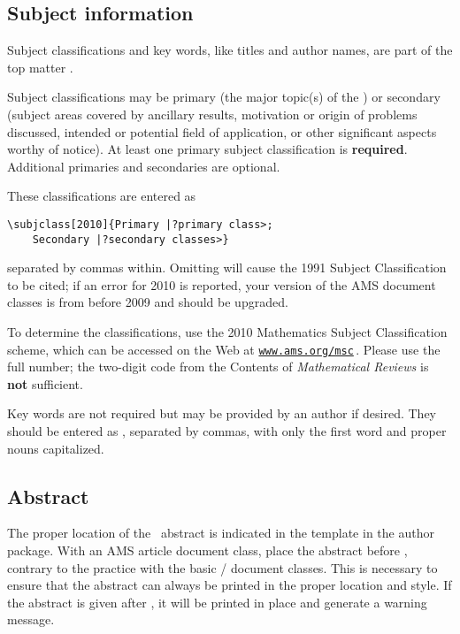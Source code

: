 \subsection{Subject information}
Subject classifications and key words, like titles and author names, are
part of the top matter%
.

Subject classifications may be primary (the major topic(s) of the
)
or secondary (subject areas covered by ancillary results,
motivation or origin of problems discussed, intended or potential
field of application, or other significant aspects worthy of notice).
At least one primary subject classification is \textbf{required}.
Additional primaries and secondaries are optional.

\begin{samepage}
These classifications are entered as
\begin{verbatim}
\subjclass[2010]{Primary |?primary class>; 
    Secondary |?secondary classes>}
\end{verbatim}
separated by commas within. Omitting  will cause the
1991 Subject Classification
to be cited; if an error for 2010 is reported, your version of the AMS
document classes is from before 2009 and should be upgraded.
\end{samepage}

To determine the classifications, use the 2010 Mathematics Subject
Classification scheme,
which can be accessed on the Web at
\href{http://www.ams.org/msc}{\texttt{www.ams.org/msc}}\,.
Please use the full number; the two-digit code from the Contents of
\textit{Mathematical Reviews} is \textbf{not} sufficient.

Key words are not required but may be provided by an author if desired.
They should be entered as , separated by commas,
with only the first word and proper nouns capitalized.

\ifmonograph
\else
\subsection{Abstract}
\ifmemoirs
 The proper location of the \Memos\ abstract is indicated in
 the template in the author package.
\else
 With an AMS article document class, place the abstract before ,
 contrary to the practice with the basic \latex/ document classes.
 This is necessary to ensure that the abstract can always be printed in
 the proper location and style.  If the abstract is given after
 , it will be printed in place and generate a warning
 message.
\fi

